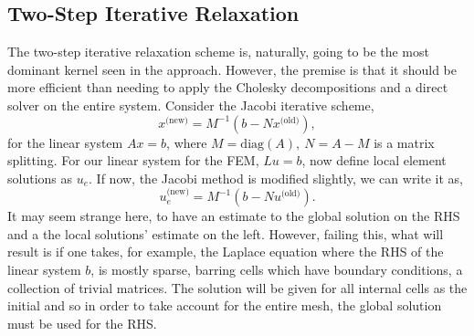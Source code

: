 \subsection{Two-Step Iterative Relaxation}

The two-step iterative relaxation scheme is, naturally, going to be the most dominant kernel seen in the approach. However, the premise is that it should be more efficient than needing to apply the Cholesky decompositions and a direct solver on the entire system. Consider the Jacobi iterative scheme,
\begin{equation}
	x^{\text{(new)}} = M^{-1}(b - N x^{\text{(old)}}),
\end{equation}
for the linear system $Ax=b$, where $M = \text{diag}(A),~N=A-M$ is a matrix splitting. For our linear system for the FEM, $Lu = b$, now define local element solutions as $u_e$. If now, the Jacobi method is modified slightly, we can write it as,
\begin{equation}\label{jacobi}
	u^{\text{(new)}}_e = M^{-1}(b - N u^{\text{(old)}}).
\end{equation}
It may seem strange here, to have an estimate to the global solution on the RHS and a the local solutions' estimate on the left. However, failing this, what will result is  if one takes, for example, the Laplace equation where the RHS of the linear system $b$, is mostly sparse, barring cells which have boundary conditions, a collection of trivial matrices. The solution will be given for all internal cells as the initial and so in order to take account for the entire mesh, the global solution must be used for the RHS.

